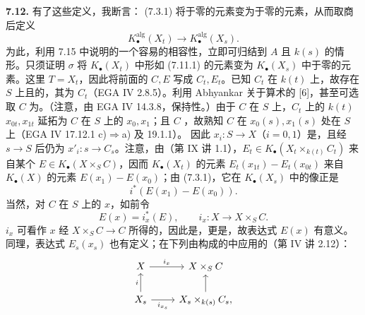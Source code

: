 \textbf{7.12.} 有了这些定义，我断言： (7.3.1) 将于零的元素变为于零的元素，从而取商后定义
\[K_\bullet^{\mathrm{alg}}(X_t)\longrightarrow K_\bullet^{\mathrm{alg}}(X_s).\tag{7.12.1}\]
为此，利用 7.15 中说明的一个容易的相容性，立即可归结到 $A$ 且 $k(s)$ 的情形。只须证明 $\sigma$ 将 $K_\bullet(X_t)$ 中形如 (7.11.1) 的元素变为 $K_\bullet(X_s)$ 中于零的元素。这里 $T=X_t$，因此将前面的 $C,E$ 写成 $C_t,E_t$。已知 $C_t$ 在 $k(t)$ 上，故存在 $S$ 上且的，其为 $C_t$（EGA IV 2.8.5）。利用 Abhyankar 关于算术的 [6]，甚至可选取 $C$ 为。（注意，由 EGA IV 14.3.8，保持性。）由于 $C$ 在 $S$ 上，$C_t$ 上的 $k(t)$  $x_{0t},x_{1t}$ 延拓为 $C$ 在 $S$ 上的 $x_0,x_1$；且 $C$ ，故熟知 $C$ 在 $x_0(s),x_1(s)$ 处在 $S$ 上（EGA IV 17.12.1 c)$\Rightarrow$a) 及 19.1.1）。
因此 $x_i:S\to X$（$i=0,1$）是，且经 $s\to S$ 后仍为 $x'_i:s\to C_s$。注意，由（第 IX 讲 1.1），$E_t\in K_\bullet(X_t\times_{k(t)}C_t)$ 来自某个 $E\in K_\bullet(X\times_S C)$，因而 $K_\bullet(X_t)$ 的元素 $E_t(x_{1t})-E_t(x_{0t})$ 来自 $K_\bullet(X)$ 的元素 $E(x_1)-E(x_0)$；由 (7.3.1)，它在 $K_\bullet(X_s)$ 中的像正是
\[i^*(E(x_1)-E(x_0)).\tag{*}\]
当然，对 $C$ 在 $S$ 上的 $x$，如前令
\[E(x)=i_x^*(E),\qquad i_x:X\longrightarrow X\times_S C.\]
$i_x$ 可看作 $x$ 经 $X\times_S C\to C$ 所得的，因此是，更是，故表达式 $E(x)$ 有意义。同理，表达式 $E_s(x_s)$ 也有定义；在下列由构成的中应用的（第 IV 讲 2.12）：
\[\begin{tikzcd}X\arrow[r,"i_x"]&X\times_S C\\X_s\arrow[u,"i"]\arrow[r,"i_{x_s}"']&X_s\times_{k(s)}C_s\arrow[u],\end{tikzcd}\]
